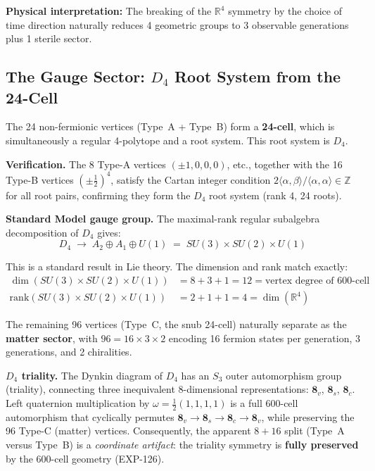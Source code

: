 \documentclass[12pt,a4paper]{article}
\begin{document}
\textbf{Physical interpretation:} The breaking of the $\mathbb{R}^4$ symmetry by the choice of time direction naturally reduces 4 geometric groups to 3 observable generations plus 1 sterile sector.

\subsection{The Gauge Sector: $D_4$ Root System from the 24-Cell}
\label{sec:gauge}

The 24 non-fermionic vertices (Type~A + Type~B) form a \textbf{24-cell}, which is simultaneously a regular 4-polytope and a root system. This root system is $D_4$.

\textbf{Verification.} The 8 Type-A vertices $(\pm 1, 0, 0, 0)$, etc., together with the 16 Type-B vertices $(\pm\tfrac{1}{2})^4$, satisfy the Cartan integer condition $2\langle \alpha, \beta\rangle / \langle \alpha, \alpha\rangle \in \mathbb{Z}$ for all root pairs, confirming they form the $D_4$ root system (rank 4, 24 roots).

\textbf{Standard Model gauge group.} The maximal-rank regular subalgebra decomposition of $D_4$ gives:
\begin{equation}
\boxed{D_4 \;\to\; A_2 \oplus A_1 \oplus U(1) \;=\; SU(3) \times SU(2) \times U(1)}
\end{equation}

This is a standard result in Lie theory. The dimension and rank match exactly:
\begin{align}
\dim(SU(3) \times SU(2) \times U(1)) &= 8 + 3 + 1 = 12 = \text{vertex degree of 600-cell} \\
\mathrm{rank}(SU(3) \times SU(2) \times U(1)) &= 2 + 1 + 1 = 4 = \dim(\mathbb{R}^4)
\end{align}

The remaining 96 vertices (Type~C, the snub 24-cell) naturally separate as the \textbf{matter sector}, with $96 = 16 \times 3 \times 2$ encoding 16 fermion states per generation, 3 generations, and 2 chiralities.

\textbf{$D_4$ triality.} The Dynkin diagram of $D_4$ has an $S_3$ outer automorphism group (triality), connecting three inequivalent 8-dimensional representations: $\mathbf{8}_v$, $\mathbf{8}_s$, $\mathbf{8}_c$. Left quaternion multiplication by $\omega = \tfrac{1}{2}(1,1,1,1)$ is a full 600-cell automorphism that cyclically permutes $\mathbf{8}_v \to \mathbf{8}_s \to \mathbf{8}_c \to \mathbf{8}_v$, while preserving the 96 Type-C (matter) vertices. Consequently, the apparent $8 + 16$ split (Type~A versus Type~B) is a \emph{coordinate artifact}: the triality symmetry is \textbf{fully preserved} by the 600-cell geometry (EXP-126).
\end{document}
